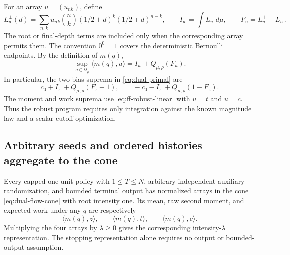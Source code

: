 For an array $u=(u_{nk})$, define
\[
 L_u^\pm(d)
 =\sum_{n,k}u_{nk}\binom nk
          (1/2\pm d)^k(1/2\mp d)^{n-k},
 \qquad
 I_u^-=\int L_u^-\,d\mu,\qquad
 F_u=L_u^+-L_u^-.
\]
The root or final-depth terms are included only when the corresponding
array permits them. The convention $0^0=1$ covers the deterministic
Bernoulli endpoints. By the definition of $m(q)$,
\begin{equation}\label{eq:ff-robust-linear}
 \sup_{q\in\mathcal Q_\rho}\langle m(q),u\rangle
 =I_u^-+Q_{\mu,\rho}(F_u).
\end{equation}
In particular, the two bias suprema in \eqref{eq:dual-primal} are
\[
 c_0+I_z^-+Q_{\mu,\rho}(F_z-1),
 \qquad
 -c_0-I_z^-+Q_{\mu,\rho}(1-F_z).
\]
The moment and work suprema use \eqref{eq:ff-robust-linear} with
$u=t$ and $u=c$. Thus the robust program requires only integration
against the known magnitude law and a scalar cutoff optimization.

\subsection{Arbitrary seeds and ordered histories aggregate to the cone}

\begin{proposition}
\label{prop:ff-aggregation}
Every capped one-unit policy with $1\le T\le N$, arbitrary independent
auxiliary randomization, and bounded terminal output has normalized
arrays in the cone \eqref{eq:dual-flow-cone} with root intensity one.
Its mean, raw second moment, and expected work under any $q$ are
respectively
\[
 \langle m(q),z\rangle,\qquad
 \langle m(q),t\rangle,\qquad
 \langle m(q),c\rangle.
\]
Multiplying the four arrays by $\lambda\ge0$ gives the corresponding
intensity-$\lambda$ representation. The stopping representation alone
requires no output or bounded-output assumption.
\end{proposition}

